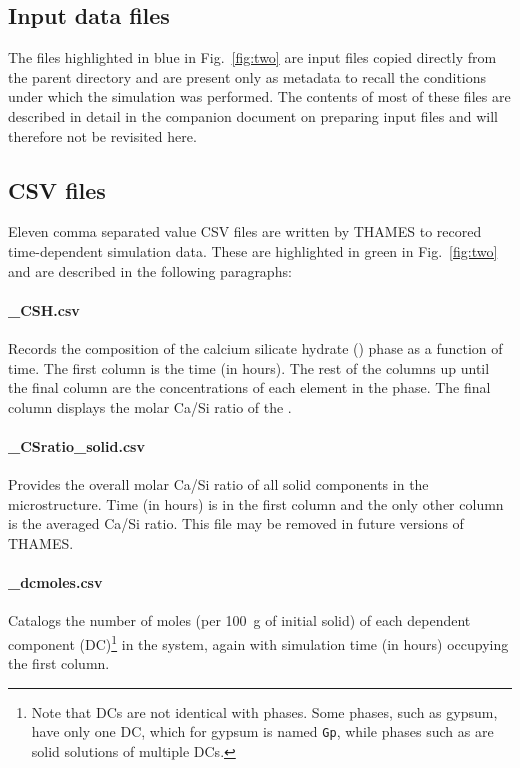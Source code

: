 \documentclass{article}
\begin{document}
\subsection{Input data files}
The files highlighted in blue in Fig.~\ref{fig:two} are input files
copied directly from the parent directory and are present only as
metadata to recall the conditions under which the simulation was
performed. The contents of most of these files are described in detail
in the companion document on preparing input files and will therefore
not be revisited here.

\subsection{CSV files}
Eleven comma separated value CSV files are written by THAMES to
recored time-dependent simulation data. These are highlighted in green in
Fig.~\ref{fig:two} and are described in the following paragraphs:

\paragraph{\_CSH.csv} Records the composition of the calcium silicate
hydrate () phase as a function of time. The first column is the time (in hours).
The rest of the columns up until the final column are the concentrations
of each element in the  phase. The final column displays the
molar Ca/Si ratio of the .

\paragraph{\_CSratio\_solid.csv} Provides the overall molar Ca/Si ratio of all
solid components in the microstructure. Time (in hours) is in the first column
and the only other column is the averaged Ca/Si ratio. This file may be
removed in future versions of THAMES.

\paragraph{\_dcmoles.csv} Catalogs the number of moles (per \qty{100}{\gram}
of initial solid) of each dependent component (DC)\footnote{Note that DCs are
	not identical with phases. Some phases, such as gypsum, have only one
	DC, which for gypsum is named \texttt{Gp}, while phases such as 
	are solid solutions of multiple DCs.}
in the system, again with
simulation time (in hours) occupying the first column.
\end{document}
